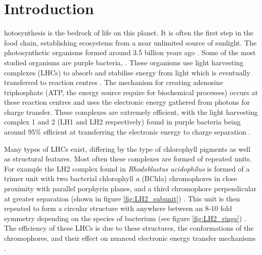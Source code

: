 %
%
\chapter{Introduction}
\label{chap:intro}

hotosynthesis is the bedrock of life on this planet. It is often the 
first step in the food chain, establishing ecosystems from a near unlimited source 
of sunlight. The photosynthetic organisms formed around 3.5 billion years ago \cite{Blankenship2010}.
Some of the most studied organisms are
purple bacteria, \cite{Cogdell2021}. These organisms use light harvesting complexes 
(LHCs) to absorb and stabilise energy from light which is eventually transferred 
to reaction centres \cite{Klamt2008}. The mechanism for creating adenosine triphosphate
(ATP, the energy source require for biochemical processes) occurs at these reaction
centres and uses the electronic energy gathered from photons for charge transfer.
These complexes are extremely efficient, with the light harvesting complex 1 and 
2 (LH1 and LH2 respectively) found in purple bacteria being around 95\% efficient
at transferring the electronic energy to charge separation \cite{Tretiak2000}.

Many types of LHCs exist, differing by the type of chlorophyll pigments as well 
as structural features. Most often these complexes are formed of repeated units.
For example the LH2 complex found in \emph{Rhodoblastus acidophilus} is formed of 
a trimer unit with two bacterial chlorophyll \emph{a} (BChla) chromophores in close 
proximity with parallel porphyrin planes, and a third chromophore perpendicular 
at greater separation (shown in figure \ref{fig:LH2_subunit}) \cite{Cogdell2006}. 
This unit is then repeated to form a circular structure with anywhere between an
8-10 fold symmetry depending on the species of bacterium (see figure \ref{fig:LH2_rings})
\cite{Mallus2018, Cleary2013}. The efficiency of these LHCs is due to these structures,
the conformations of the chromophores, and their effect on nuanced electronic energy
transfer mechanisms \cite{Harel2012}.

